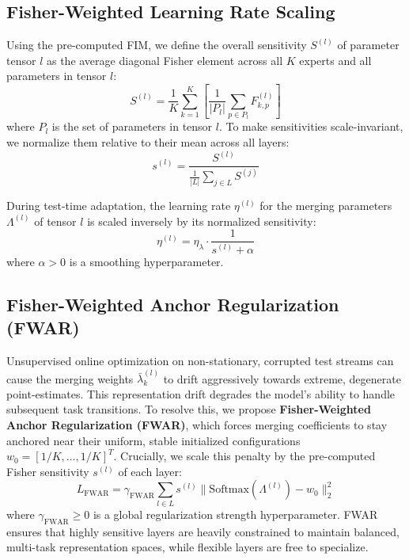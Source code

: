 \documentclass{article}
\begin{document}
\subsection{Fisher-Weighted Learning Rate Scaling}
Using the pre-computed FIM, we define the overall sensitivity $S^{(l)}$ of parameter tensor $l$ as the average diagonal Fisher element across all $K$ experts and all parameters in tensor $l$:
\begin{equation}
    S^{(l)} = \frac{1}{K} \sum_{k=1}^K \left[ \frac{1}{|P_l|} \sum_{p \in P_l} F_{k,p}^{(l)} \right]
\end{equation}
where $P_l$ is the set of parameters in tensor $l$. To make sensitivities scale-invariant, we normalize them relative to their mean across all layers:
\begin{equation}
    s^{(l)} = \frac{S^{(l)}}{\frac{1}{|L|} \sum_{j \in L} S^{(j)}}
\end{equation}

During test-time adaptation, the learning rate $\eta^{(l)}$ for the merging parameters $\Lambda^{(l)}$ of tensor $l$ is scaled inversely by its normalized sensitivity:
\begin{equation}
    \eta^{(l)} = \eta_{\lambda} \cdot \frac{1}{s^{(l)} + \alpha}
\end{equation}
where $\alpha > 0$ is a smoothing hyperparameter.

\subsection{Fisher-Weighted Anchor Regularization (FWAR)}
Unsupervised online optimization on non-stationary, corrupted test streams can cause the merging weights $\bar{\lambda}_k^{(l)}$ to drift aggressively towards extreme, degenerate point-estimates. This representation drift degrades the model's ability to handle subsequent task transitions. To resolve this, we propose \textbf{Fisher-Weighted Anchor Regularization (FWAR)}, which forces merging coefficients to stay anchored near their uniform, stable initialized configurations $w_0 = [1/K, \dots, 1/K]^T$. Crucially, we scale this penalty by the pre-computed Fisher sensitivity $s^{(l)}$ of each layer:
\begin{equation}
    L_{\text{FWAR}} = \gamma_{\text{FWAR}} \sum_{l \in L} s^{(l)} \| \text{Softmax}(\Lambda^{(l)}) - w_0 \|_2^2
\end{equation}
where $\gamma_{\text{FWAR}} \ge 0$ is a global regularization strength hyperparameter. FWAR ensures that highly sensitive layers are heavily constrained to maintain balanced, multi-task representation spaces, while flexible layers are free to specialize.
\end{document}
